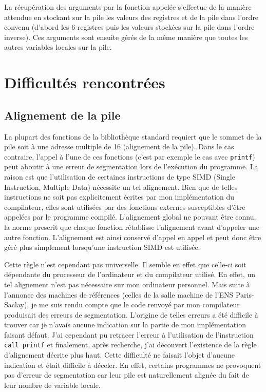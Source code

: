 \documentclass[11pt]{article}
\newcommand{\ttt}[1]{\texttt{#1}}
\begin{document}
La récupération des arguments par la fonction appelée s'effectue de la manière attendue en stockant sur la pile les valeurs des registres et de la pile dans l'ordre convenu (d'abord les 6 registres puis les valeurs stockées sur la pile dans l'ordre inverse).
Ces arguments sont ensuite gérés de la même manière que toutes les autres variables locales sur la pile.

\section{Difficultés rencontrées}
\subsection{Alignement de la pile}
La plupart des fonctions de la bibliothèque standard requiert que le sommet de la pile soit à une adresse multiple de 16 (alignement de la pile).
Dans le cas contraire, l'appel à l'une de ces fonctions (c'est par exemple le cas avec \ttt{printf}) peut aboutir à une erreur de segmentation lors de l'exécution du programme.
La raison est que l'utilisation de certaines instructions de type SIMD (Single Instruction, Multiple Data) nécessite un tel alignement.
Bien que de telles instructions ne soit pas explicitement écrites par mon implémentation du compilateur, elles sont utilisées par des fonctions externes susceptibles d'être appelées par le programme compilé.
L'alignement global ne pouvant être connu, la norme prescrit que chaque fonction rétablisse l'alignement avant d'appeler une autre fonction.
L'alignement est ainsi conservé d'appel en appel et peut donc être géré plus simplement lorsqu’une instruction SIMD est utilisée.

Cette règle n'est cependant pas universelle. Il semble en effet que celle-ci soit dépendante du processeur de l'ordinateur et du compilateur utilisé.
En effet, un tel alignement n'est pas nécessaire sur mon ordinateur personnel.
Mais suite à l'annonce des machines de références (celles de la salle machine de l'ENS Paris-Saclay), je me suis rendu compte que le code renvoyé par mon compilateur produisait des erreurs de segmentation.
L'origine de telles erreurs a été difficile à trouver car je n'avais aucune indication sur la partie de mon implémentation faisant défaut.
J'ai cependant pu retracer l'erreur à l'utilisation de l'instruction \ttt{call printf} et finalement, après recherche, j'ai découvert l'existence de la règle d'alignement décrite plus haut.
Cette difficulté ne faisait l'objet d'aucune indication et était difficile à déceler.
En effet, certains programmes ne provoquent pas d'erreur de segmentation car leur pile est naturellement alignée du fait de leur nombre de variable locale.
\end{document}
